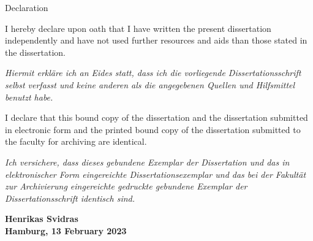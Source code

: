     \begin{abstractpage}{Declaration}
    
        I hereby declare upon oath that I have written the present dissertation independently and have not used further resources and aids than those stated in the dissertation.
        
        \textit{Hiermit erkläre ich an Eides statt, dass ich die vorliegende Dissertationsschrift selbst verfasst und keine anderen als die angegebenen Quellen und Hilfsmittel benutzt habe.}
    
        I declare that this bound copy of the dissertation and the dissertation submitted in electronic form and the printed bound copy of the dissertation submitted to the faculty for archiving are identical.
    
        \textit{Ich versichere, dass dieses gebundene Exemplar der Dissertation und das in elektronischer Form eingereichte Dissertationsexemplar und das bei der Fakultät zur Archivierung eingereichte gedruckte gebundene Exemplar der Dissertationsschrift identisch sind.}
    
        \par\bigskip
        \par\bigskip
        
        \begin{flushright}
        \par\bigskip
        \textbf{Henrikas Svidras}\\
        \textbf{Hamburg, 13 February 2023}
        \end{flushright}
        \end{abstractpage}
